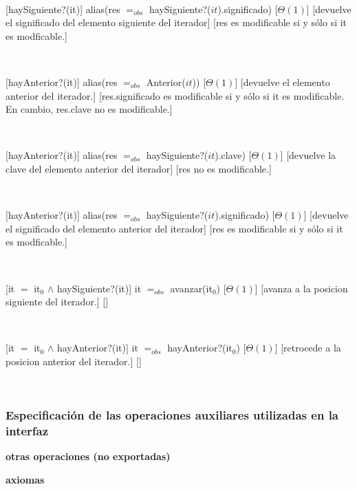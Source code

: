 ~

[haySiguiente?(it)]
{alias(res $=_{obs}$ haySiguiente?($it$).significado)}
[$\Theta(1)$]
[devuelve el significado del elemento siguiente del iterador]
[res es modificable si y sólo si it es modficable.]

~

[hayAnterior?(it)]
{alias(res $=_{obs}$ Anterior($it$))}
[$\Theta(1)$]
[devuelve el elemento anterior del iterador.]
[res.significado es modificable si y sólo si it es modificable. En cambio, res.clave no es modificable.]

~

[hayAnterior?(it)]
{alias(res $=_{obs}$ haySiguiente?($it$).clave)}
[$\Theta(1)$]
[devuelve la clave del elemento anterior del iterador]
[res no es modificable.]

~

[hayAnterior?(it)]
{alias(res $=_{obs}$ haySiguiente?($it$).significado)}
[$\Theta(1)$]
[devuelve el significado del elemento anterior del iterador]
[res es modificable si y sólo si it es modficable.]

~

[it $=$ it$_0$ $\land$ haySiguiente?(it)]
{it $=_{obs}$ avanzar(it$_0$)}
[$\Theta(1)$]
[avanza a la posicion siguiente del iterador.]
[]

~

[it $=$ it$_0$ $\land$ hayAnterior?(it)]
{it $=_{obs}$ hayAnterior?(it$_0$)}
[$\Theta(1)$]
[retrocede a la posicion anterior del iterador.]
[]

~

\subsubsection{Especificación de las operaciones auxiliares utilizadas en la interfaz}

\begin{tad}{}
	\textbf{otras operaciones (no exportadas)}


	\textbf{axiomas}

\end{tad}

